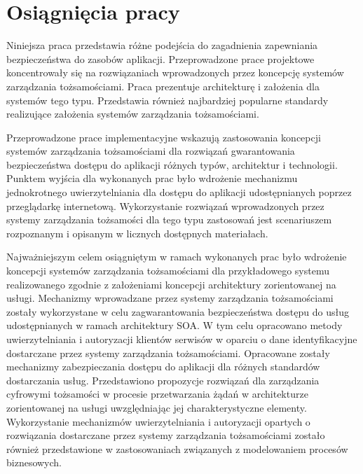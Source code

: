 
\section{Osiągnięcia pracy}
\label{sec:osiagnieciaPracy}

	Niniejsza praca przedstawia różne podejścia do zagadnienia zapewniania bezpieczeństwa do zasobów aplikacji. Przeprowadzone prace projektowe koncentrowały się na rozwiązaniach wprowadzonych przez koncepcję systemów zarządzania tożsamościami. Praca prezentuje architekturę i założenia dla systemów tego typu. Przedstawia również najbardziej popularne standardy realizujące założenia systemów zarządzania tożsamościami.

	Przeprowadzone prace implementacyjne wskazują zastosowania koncepcji systemów zarządzania tożsamościami dla rozwiązań gwarantowania bezpieczeństwa dostępu do aplikacji różnych typów, architektur i technologii. Punktem wyjścia dla wykonanych prac było wdrożenie mechanizmu jednokrotnego uwierzytelniania dla dostępu do aplikacji udostępnianych poprzez przeglądarkę internetową. Wykorzystanie rozwiązań wprowadzonych przez systemy zarządzania tożsamości dla tego typu zastosowań jest scenariuszem rozpoznanym i opisanym w licznych dostępnych materiałach.

	Najważniejszym celem osiągniętym w ramach wykonanych prac było wdrożenie koncepcji systemów zarządzania tożsamościami dla przykładowego systemu realizowanego zgodnie z założeniami koncepcji architektury zorientowanej na usługi. Mechanizmy wprowadzane przez systemy zarządzania tożsamościami zostały wykorzystane w celu zagwarantowania bezpieczeństwa dostępu do usług udostępnianych w ramach architektury SOA. W tym celu opracowano metody uwierzytelniania i autoryzacji klientów serwisów w oparciu o dane identyfikacyjne dostarczane przez systemy zarządzania tożsamościami. Opracowane zostały mechanizmy zabezpieczania dostępu do aplikacji dla różnych standardów dostarczania usług. Przedstawiono propozycje rozwiązań dla zarządzania cyfrowymi tożsamości w procesie przetwarzania żądań w architekturze zorientowanej na usługi uwzględniając jej charakterystyczne elementy. Wykorzystanie mechanizmów uwierzytelniania i autoryzacji opartych o rozwiązania dostarczane przez systemy zarządzania tożsamościami zostało również przedstawione w zastosowaniach związanych z modelowaniem procesów biznesowych.
